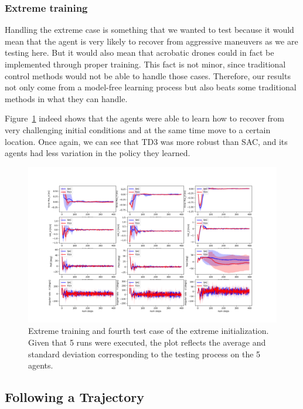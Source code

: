 \subsubsection{Extreme training}

Handling the extreme case is something that we wanted to test because it would mean that the agent 
is very likely to recover from aggressive maneuvers as we are testing here. But it would 
also mean that acrobatic drones could in fact be implemented through proper training. This 
fact is not minor, since traditional control methods would not be able to handle those cases.
Therefore, our results not only come from a model-free learning process but also beats some 
traditional methods in what they can handle.

Figure~\ref{fig:extreme_extreme_1} indeed shows that the agents were able to learn 
how to recover from very challenging initial conditions and at the same time move 
to a certain location. Once again, we can see that TD3 was more robust than SAC, and its agents had less variation in the policy they learned.

\begin{figure}[H]
    \centering
    \includegraphics[width = 1\textwidth]{img/2022-05-05_00:00:00_extreme_states_3_extreme.png}
    \caption{Extreme training and fourth test case of the extreme initialization. Given 
    that 5 runs were executed, the plot reflects the average and standard deviation 
    corresponding to the testing process on the 5 agents.}
    \label{fig:extreme_extreme_1}
\end{figure}

\subsection{Following a Trajectory}

